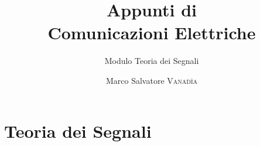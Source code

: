 \documentclass[10pt,a4paper,onecolumn,titlepage,twoside,openright,final]{book}
\title{Appunti di \\ Comunicazioni Elettriche}
\subtitle{Modulo Teoria dei Segnali}
\author{Marco Salvatore \textsc{Vanadìa}}
\begin{document}
\frontmatter
\maketitle

\cleardoublepage\clearpage{\pagestyle{empty}\cleardoublepage}
\tableofcontents

\mainmatter

\part{Teoria dei Segnali}











{}

\printindex

%
\end{document}
